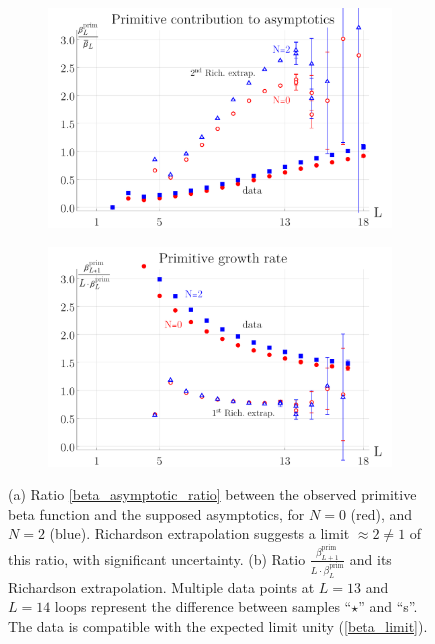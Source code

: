 \documentclass[12pt,a4paper]{article}
\renewcommand{\|}{\rule[-0.4ex]{0.2ex}{1.2em}}
\begin{document}
\begin{figure}[htb]
	\centering 
	\begin{subfigure}[b]{.49 \textwidth}
		\includegraphics[width=\linewidth]{beta_relative}
		\subcaption{}
		\label{fig:beta_relative}
	\end{subfigure}
	\begin{subfigure}[b]{.49 \textwidth}
		\includegraphics[width=\linewidth]{beta_growth_rate}
		\subcaption{}
		\label{fig:beta_growth_rate}
	\end{subfigure}
	
	\caption{(a) Ratio \cref{beta_asymptotic_ratio} between the observed primitive beta function and the supposed asymptotics, for $N=0$ (red),  and $N=2$ (blue). Richardson extrapolation  suggests a limit $\approx 2\neq 1$ of this ratio, with significant uncertainty. (b) Ratio $\frac{\beta^{\text{prim}}_{L+1}}{L\cdot \beta^{\text{prim}}_{L}}$ and its Richardson extrapolation. Multiple data points at $L=13$ and $L=14$ loops represent the difference between samples \enquote{$\star$} and \enquote{s}. The data is compatible with the expected limit unity (\cref{beta_limit}). }
	\label{fig:beta_ratios}
\end{figure}
\end{document}
